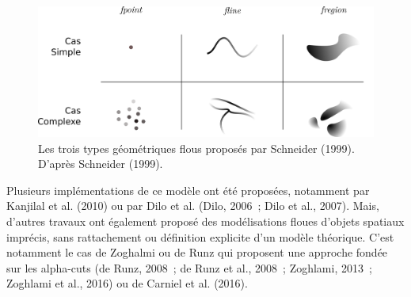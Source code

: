 \begin{figure}
  \centering
  \includegraphics{../figures/fig8.png}
  \caption{Les trois types géométriques flous proposés par Schneider
    (1999). D’après Schneider (1999).}
  \label{fig:mod_schneider}
\end{figure}

Plusieurs implémentations de ce modèle ont été proposées, notamment
par Kanjilal et al. (2010) ou par Dilo et al. (Dilo, 2006 ; Dilo et
al., 2007). Mais, d’autres travaux ont également proposé des
modélisations floues d’objets spatiaux imprécis, sans rattachement ou
définition explicite d’un modèle théorique. C’est notamment le cas de
Zoghalmi ou de Runz qui proposent une approche fondée sur les
alpha-cuts (de Runz, 2008 ; de Runz et al., 2008 ; Zoghlami, 2013 ;
Zoghlami et al., 2016) ou de Carniel et al. (2016).

